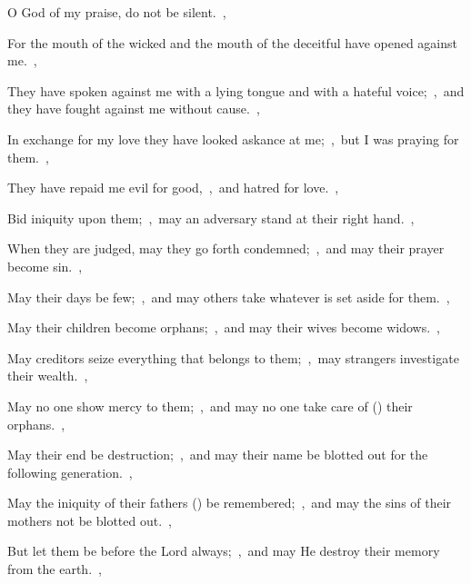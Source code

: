 \documentclass[12pt,twoside,a5paper]{article}
\begin{document}



\begin{normalparskip}
  O God of my praise, do not be silent.~\sep

  For the mouth of the wicked and the mouth of the deceitful have opened against me.~\sep


  They have spoken against me with a lying tongue and with a hateful voice;~\sep\ and they have fought against me without cause.~\sep

  In exchange for my love they have looked askance at me;~\sep\ but I was praying for them.~\sep

  They have repaid me evil for good,~\sep\ and hatred for love.~\sep

  Bid iniquity upon them;~\sep\ may an adversary stand at their right hand.~\sep

  When they are judged, may they go forth condemned;~\sep\ and may their prayer become sin.~\sep

  May their days be few;~\sep\ and may others take whatever is set aside for them.~\sep

  May their children become orphans;~\sep\ and may their wives become widows.~\sep

  May creditors seize everything that belongs to them;~\sep\ may strangers investigate their wealth.~\sep

  May no one show mercy to them;~\sep\ and may no one take care of () their orphans.~\sep

  May their end be destruction;~\sep\ and may their name be blotted out for the following generation.~\sep

  May the iniquity of their fathers () be remembered;~\sep\ and may the sins of their mothers not be blotted out.~\sep

  But let them be before the Lord always;~\sep\ and may He destroy their memory from the earth.~\sep


\end{normalparskip}
\end{document}
